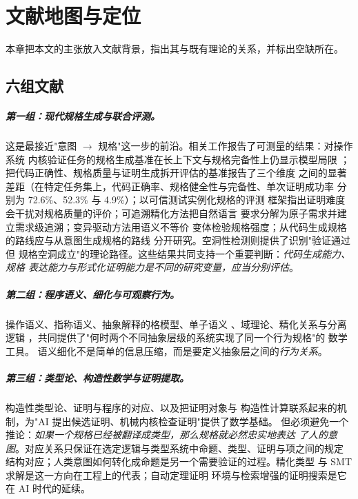 \chapter{文献地图与定位}\label{ch:literature}

本章把本文的主张放入文献背景，指出其与既有理论的关系，并标出空缺所在。

\section{六组文献}\label{sec:six-groups}

\paragraph{第一组：现代规格生成与联合评测。}
这是最接近"意图 $\to$ 规格"这一步的前沿。相关工作报告了可测量的结果：对操作系统
内核验证任务的规格生成基准在长上下文与规格完备性上仍显示模型局限
\cite{osvbench2026}；把代码正确性、规格质量与证明生成拆开评估的基准报告了三个维度
之间的显著差距（在特定任务集上，代码正确率、规格健全性与完备性、单次证明成功率
分别为 72.6\%、52.3\% 与 4.9\%）\cite{verina2026}；以可信测试实例化规格的评测
框架指出证明难度会干扰对规格质量的评价\cite{coins2026}；可追溯精化方法把自然语言
要求分解为原子需求并建立需求级追溯\cite{verispecgen2026}；变异驱动方法用语义不等价
变体检验规格强度\cite{specsyn2026}；从代码生成规格的路线应与从意图生成规格的路线
分开研究\cite{specgen2025}。空洞性检测\cite{kupferman2003}则提供了识别"验证通过但
规格空洞成立"的理论路径。这些结果共同支持一个重要判断：\emph{代码生成能力、规格
表达能力与形式化证明能力是不同的研究变量，应当分别评估}。

\paragraph{第二组：程序语义、细化与可观察行为。}
操作语义、指称语义、抽象解释的格模型\cite{cousot1977}、单子语义
\cite{moggi1991,plotkin2002}、域理论、精化关系\cite{hoare1969}与分离逻辑
\cite{appel2007}，共同提供了"何时两个不同抽象层级的系统实现了同一个行为规格"的
数学工具。
语义细化不是简单的信息压缩，而是要定义抽象层之间的\emph{行为关系}。

\paragraph{第三组：类型论、构造性数学与证明提取。}
构造性类型论\cite{hott2013}、证明与程序的对应\cite{howard1980}、以及把证明对象与
构造性计算联系起来的机制，为"AI 提出候选证明、机械内核检查证明"提供了数学基础。
但必须避免一个推论：\emph{如果一个规格已经被翻译成类型，那么规格就必然忠实地表达
了人的意图}。对应关系只保证在选定逻辑与类型系统中命题、类型、证明与项之间的规定
结构对应；人类意图如何转化成命题是另一个需要验证的过程。精化类型
\cite{rondon2008}与 SMT 求解\cite{z32008}是这一方向在工程上的代表；自动定理证明
环境与检索增强的证明搜索\cite{leandojo2023,leancopilot2024}是它在 AI 时代的延续。

